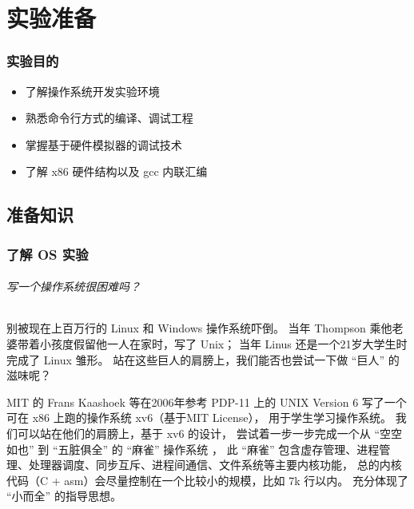 \part{实验准备}

\section*{\HandRight\hspace{0.5em}实验目的}
\begin{minipage}[t]{0.8\textwidth}
\begin{heiti}
\begin{itemize}
\renewcommand\labelitemi{\FiveStarShadow}
    \item \begin{large} 了解操作系统开发实验环境 \end{large}
    \item \begin{large} 熟悉命令行方式的编译、调试工程 \end{large}
    \item \begin{large} 掌握基于硬件模拟器的调试技术 \end{large}
    \item \begin{large} 了解 x86 硬件结构以及 gcc 内联汇编 \end{large}
\end{itemize}
\end{heiti}
\end{minipage}

\chapter{准备知识}

\section{了解 OS 实验}

\paragraph{写一个操作系统很困难吗？}
别被现在上百万行的 Linux 和 Windows 操作系统吓倒。
当年 Thompson 乘他老婆带着小孩度假留他一人在家时，写了 Unix；
当年 Linus 还是一个21岁大学生时完成了 Linux 雏形。
站在这些巨人的肩膀上，我们能否也尝试一下做 “巨人” 的滋味呢？

MIT 的 Frans Kaashoek 等在2006年参考 PDP-11 上的 UNIX Version 6
写了一个可在 x86 上跑的操作系统 xv6（基于MIT License），
用于学生学习操作系统。
我们可以站在他们的肩膀上，基于 xv6 的设计，
尝试着一步一步完成一个从 “空空如也” 到 “五脏俱全” 的 “麻雀” 操作系统 \cndash \ucore，
此 “麻雀” 包含虚存管理、进程管理、处理器调度、同步互斥、进程间通信、文件系统等主要内核功能，
总的内核代码（C + asm）会尽量控制在一个比较小的规模，比如 7k 行以内。
充分体现了 “小而全” 的指导思想。

